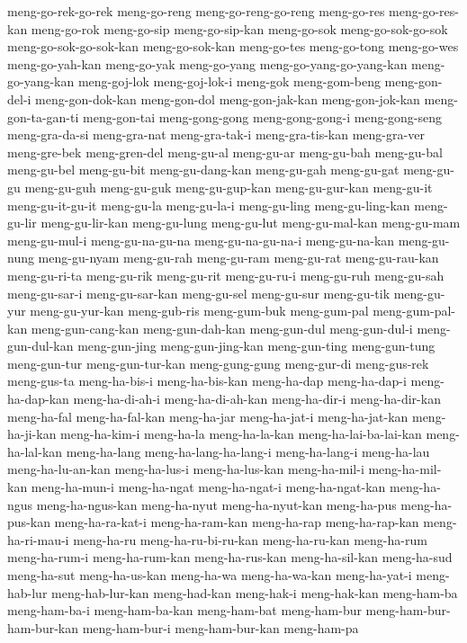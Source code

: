 {meng-go-rek-go-rek meng-go-reng meng-go-reng-go-reng meng-go-res
meng-go-res-kan meng-go-rok meng-go-sip meng-go-sip-kan meng-go-sok
meng-go-sok-go-sok meng-go-sok-go-sok-kan meng-go-sok-kan meng-go-tes
meng-go-tong meng-go-wes meng-go-yah-kan meng-go-yak meng-go-yang
meng-go-yang-go-yang-kan meng-go-yang-kan meng-goj-lok meng-goj-lok-i
meng-gok meng-gom-beng meng-gon-del-i meng-gon-dok-kan meng-gon-dol
meng-gon-jak-kan meng-gon-jok-kan meng-gon-ta-gan-ti meng-gon-tai
meng-gong-gong meng-gong-gong-i meng-gong-seng meng-gra-da-si meng-gra-nat
meng-gra-tak-i meng-gra-tis-kan meng-gra-ver meng-gre-bek meng-gren-del
meng-gu-al meng-gu-ar meng-gu-bah meng-gu-bal meng-gu-bel meng-gu-bit
meng-gu-dang-kan meng-gu-gah meng-gu-gat meng-gu-gu meng-gu-guh
meng-gu-guk meng-gu-gup-kan meng-gu-gur-kan meng-gu-it meng-gu-it-gu-it
meng-gu-la meng-gu-la-i meng-gu-ling meng-gu-ling-kan meng-gu-lir
meng-gu-lir-kan meng-gu-lung meng-gu-lut meng-gu-mal-kan meng-gu-mam
meng-gu-mul-i meng-gu-na-gu-na meng-gu-na-gu-na-i meng-gu-na-kan
meng-gu-nung meng-gu-nyam meng-gu-rah meng-gu-ram meng-gu-rat
meng-gu-rau-kan meng-gu-ri-ta meng-gu-rik meng-gu-rit meng-gu-ru-i
meng-gu-ruh meng-gu-sah meng-gu-sar-i meng-gu-sar-kan meng-gu-sel
meng-gu-sur meng-gu-tik meng-gu-yur meng-gu-yur-kan meng-gub-ris
meng-gum-buk meng-gum-pal meng-gum-pal-kan meng-gun-cang-kan
meng-gun-dah-kan meng-gun-dul meng-gun-dul-i meng-gun-dul-kan
meng-gun-jing meng-gun-jing-kan meng-gun-ting meng-gun-tung meng-gun-tur
meng-gun-tur-kan meng-gung-gung meng-gur-di meng-gus-rek meng-gus-ta
meng-ha-bis-i meng-ha-bis-kan meng-ha-dap meng-ha-dap-i meng-ha-dap-kan
meng-ha-di-ah-i meng-ha-di-ah-kan meng-ha-dir-i meng-ha-dir-kan
meng-ha-fal meng-ha-fal-kan meng-ha-jar meng-ha-jat-i meng-ha-jat-kan
meng-ha-ji-kan meng-ha-kim-i meng-ha-la meng-ha-la-kan
meng-ha-lai-ba-lai-kan meng-ha-lal-kan meng-ha-lang meng-ha-lang-ha-lang-i
meng-ha-lang-i meng-ha-lau meng-ha-lu-an-kan meng-ha-lus-i meng-ha-lus-kan
meng-ha-mil-i meng-ha-mil-kan meng-ha-mun-i meng-ha-ngat meng-ha-ngat-i
meng-ha-ngat-kan meng-ha-ngus meng-ha-ngus-kan meng-ha-nyut
meng-ha-nyut-kan meng-ha-pus meng-ha-pus-kan meng-ha-ra-kat-i
meng-ha-ram-kan meng-ha-rap meng-ha-rap-kan meng-ha-ri-mau-i meng-ha-ru
meng-ha-ru-bi-ru-kan meng-ha-ru-kan meng-ha-rum meng-ha-rum-i
meng-ha-rum-kan meng-ha-rus-kan meng-ha-sil-kan meng-ha-sud meng-ha-sut
meng-ha-us-kan meng-ha-wa meng-ha-wa-kan meng-ha-yat-i meng-hab-lur
meng-hab-lur-kan meng-had-kan meng-hak-i meng-hak-kan meng-ham-ba
meng-ham-ba-i meng-ham-ba-kan meng-ham-bat meng-ham-bur
meng-ham-bur-ham-bur-kan meng-ham-bur-i meng-ham-bur-kan meng-ham-pa
}

